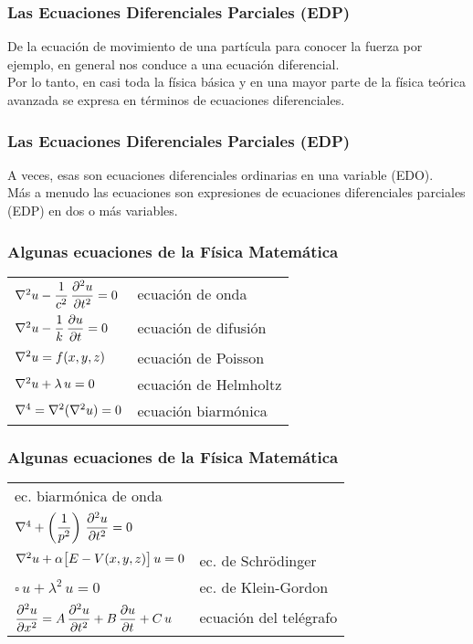 \documentclass[12pt]{beamer}
\begin{document}
\begin{frame}
\frametitle{Las Ecuaciones Diferenciales Parciales (EDP)}
De la ecuación de movimiento de una partícula para conocer la fuerza por ejemplo, en general nos conduce a una ecuación diferencial.
\\
\bigskip
\pause
Por lo tanto, en casi toda la física  básica y en una mayor parte de la física teórica avanzada se expresa en términos de ecuaciones diferenciales.
\end{frame}
\begin{frame}
\frametitle{Las Ecuaciones Diferenciales Parciales (EDP)}
A veces, esas son ecuaciones diferenciales ordinarias en una variable (EDO).
\\
\bigskip
\pause
Más a menudo las ecuaciones son expresiones de ecuaciones diferenciales parciales (EDP) en dos o más variables.
\end{frame}
\begin{frame}
\frametitle{Algunas ecuaciones de la Física Matemática}
\begin{table}
\renewcommand{\arraystretch}{1.5}
\begin{tabular}{l@{\hskip 1cm} l@{\hskip 2cm}}
$\laplacian{u} - \dfrac{1}{c^{2}} \, \displaystyle \pdv[2]{u}{t} = 0$ &ecuación de onda \pause \\
$\laplacian{u} - \dfrac{1}{k} \, \displaystyle \pdv{u}{t} = 0$ & ecuación de difusión \pause \\
$\laplacian{u} = f(x, y, z)$ & ecuación de Poisson \pause \\
$\laplacian{u} + \lambda \, u = 0$ & ecuación de Helmholtz \pause \\
$\nabla^{4} = \laplacian{(\laplacian{u})} = 0$ & ecuación biarmónica
\end{tabular}
\end{table}
\end{frame}
\begin{frame}
\frametitle{Algunas ecuaciones de la Física Matemática}
\begin{table}
\renewcommand{\arraystretch}{1.5}
\begin{tabular}{l l@{\hskip 0.6cm}}
ec. biarmónica de onda & \\
$\nabla^{4} + \left( \dfrac{1}{p^{2}} \right) \, \displaystyle \pdv[2]{u}{t} = 0$ &  \pause \\
$\laplacian{u} + \alpha \big[ E - V(x, y, z) \big] \, u = 0$ & ec. de Schrödinger \pause \\
$\square \, u + \lambda^{2} \, u = 0$ & ec. de Klein-Gordon \pause \\
$\displaystyle \pdv[2]{u}{x} = A \, \displaystyle \pdv[2]{u}{t} + B \, \displaystyle \pdv{u}{t} + C \, u$ & ecuación del telégrafo
\end{tabular}
\end{table}
\end{frame}
\end{document}
